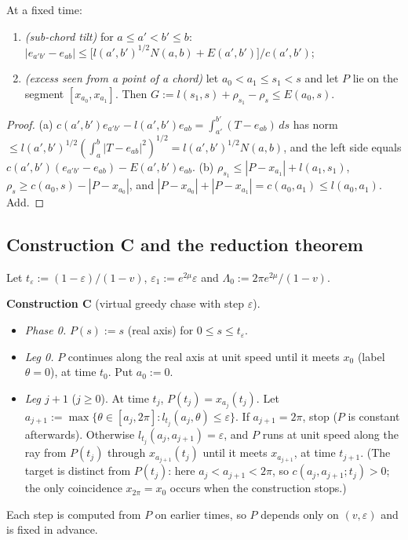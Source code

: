 \begin{lemma}\label{lem:B-4}
At a fixed time:
\begin{enumerate}
\item[(a)] \emph{(sub-chord tilt)} for $a\le a'<b'\le b$:
$|e_{a'b'}-e_{ab}|\le\bigl[l(a',b')^{1/2}N(a,b)+E(a',b')\bigr]/c(a',b')$;
\item[(b)] \emph{(excess seen from a point of a chord)} let $a_0<a_1\le s_1<s$ and let $P$ lie on the segment $[x_{a_0},x_{a_1}]$.
Then $G:=l(s_1,s)+\rho_{s_1}-\rho_s\le E(a_0,s)$.
\end{enumerate}
\end{lemma}
\begin{proof}
(a) $c(a',b')e_{a'b'}-l(a',b')e_{ab}=\int_{a'}^{b'}(T-e_{ab})\,ds$ has norm
$\le l(a',b')^{1/2}(\int_a^b|T-e_{ab}|^2)^{1/2}=l(a',b')^{1/2}N(a,b)$, and the left side equals
$c(a',b')(e_{a'b'}-e_{ab})-E(a',b')e_{ab}$.
(b) $\rho_{s_1}\le|P-x_{a_1}|+l(a_1,s_1)$, $\rho_s\ge c(a_0,s)-|P-x_{a_0}|$, and
$|P-x_{a_0}|+|P-x_{a_1}|=c(a_0,a_1)\le l(a_0,a_1)$. Add.
\end{proof}

\subsection{Construction C and the reduction theorem}

Let $t_\varepsilon:=(1-\varepsilon)/(1-v)$, $\varepsilon_1:=e^{2\mu}\varepsilon$ and $\Lambda_0:=2\pi e^{2\mu}/(1-v)$.

\medskip\noindent\textbf{Construction C} (virtual greedy chase with step $\varepsilon$).
\begin{itemize}
\item \emph{Phase 0.} $P(s):=s$ (real axis) for $0\le s\le t_\varepsilon$.
\item \emph{Leg 0.} $P$ continues along the real axis at unit speed until it meets $x_0$ (label $\theta=0$), at time $t_0$. Put
$a_0:=0$.
\item \emph{Leg $j+1$} ($j\ge0$). At time $t_j$, $P(t_j)=x_{a_j}(t_j)$. Let
$a_{j+1}:=\max\{\theta\in[a_j,2\pi]:l_{t_j}(a_j,\theta)\le\varepsilon\}$. If $a_{j+1}=2\pi$, stop ($P$ is constant afterwards).
Otherwise $l_{t_j}(a_j,a_{j+1})=\varepsilon$, and $P$ runs at unit speed along the ray from $P(t_j)$ through
$x_{a_{j+1}}(t_j)$ until it meets $x_{a_{j+1}}$, at time $t_{j+1}$. (The target is distinct from $P(t_j)$: here
$a_j<a_{j+1}<2\pi$, so $c(a_j,a_{j+1};t_j)>0$; the only coincidence $x_{2\pi}=x_0$ occurs when the construction stops.)
\end{itemize}
Each step is computed from $P$ on earlier times, so $P$ depends only on $(v,\varepsilon)$ and is fixed in advance.

